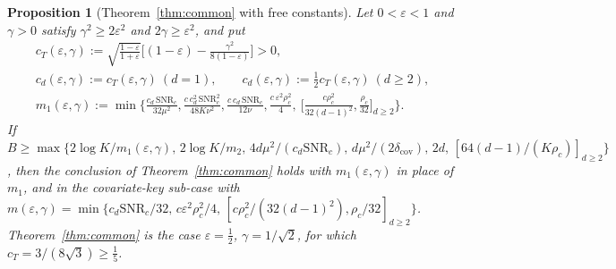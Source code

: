 \documentclass[11pt]{article}
\newtheorem{proposition}{Proposition}
\theoremstyle{definition}
\begin{document}
\begin{proposition}[Theorem~\ref{thm:common} with free constants]\label{prop:free}
Let $0<\varepsilon<1$ and $\gamma>0$ satisfy $\gamma^2\ge2\varepsilon^2$ and $2\gamma\ge\varepsilon^2$, and put
\begin{gather*}
c_T(\varepsilon,\gamma):=\sqrt{\frac{1-\varepsilon}{1+\varepsilon}}\Big[(1-\varepsilon)-\frac{\gamma^2}{8(1-\varepsilon)}\Big]>0,\\
c_d(\varepsilon,\gamma):=c_T(\varepsilon,\gamma)\ (d=1),\qquad c_d(\varepsilon,\gamma):=\tfrac12c_T(\varepsilon,\gamma)\ (d\ge2),\\
m_1(\varepsilon,\gamma):=\min\Big\{\frac{c_d\,\mathrm{SNR}_c}{32\mu^2},\frac{c\,c_d^2\,\mathrm{SNR}_c^2}{48K\nu^2},\frac{c\,c_d\,\mathrm{SNR}_c}{12\nu},\frac{c\,\varepsilon^2\rho_c^2}{4},\ \Big[\frac{c\rho_c^2}{32(d-1)^2},\frac{\rho_c}{32}\Big]_{d\ge2}\Big\}.
\end{gather*}
If $B\ge\max\{2\log K/m_1(\varepsilon,\gamma),\,2\log K/m_2,\,4d\mu^2/(c_d\mathrm{SNR}_c),\,d\mu^2/(2\delta_{\mathrm{cov}}),\,2d,\,[64(d-1)/(K\rho_c)]_{d\ge2}\}$, then the conclusion of Theorem~\ref{thm:common} holds with $m_1(\varepsilon,\gamma)$ in place of $m_1$, and in the covariate-key sub-case with $m(\varepsilon,\gamma)=\min\{c_d\mathrm{SNR}_c/32,\,c\varepsilon^2\rho_c^2/4,\,[c\rho_c^2/(32(d-1)^2),\rho_c/32]_{d\ge2}\}$. Theorem~\ref{thm:common} is the case $\varepsilon=\tfrac12$, $\gamma=1/\sqrt2$, for which $c_T=3/(8\sqrt3)\ge\tfrac15$.
\end{proposition}
\end{document}
